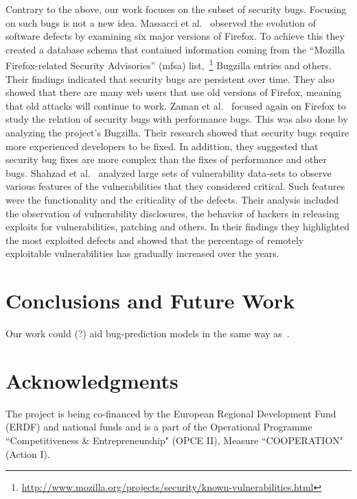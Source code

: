 \documentclass[conference]{IEEEtran}
\begin{document}
Contrary to the above, our work focuses on the subset of security bugs.
Focusing on such bugs is not a new idea. Massacci et al.~\cite{MNN11} observed
the evolution of software defects by examining six major versions of Firefox.
To achieve this they created a database schema that contained information
coming from the ``Mozilla Firefox-related Security Advisories'' ({\sc mfsa})
list,~\footnote{\url{http://www.mozilla.org/projects/security/known-vulnerabilities.html}}
Bugzilla entries and others. Their findings indicated that security bugs are
persistent over time. They also showed that there are many web users that use
old versions of Firefox, meaning that old attacks will continue to work.
Zaman et al.~\cite{ZAH11} focused again on Firefox to study the relation of
security bugs with performance bugs. This was also done by analyzing the project's
Bugzilla. Their research showed that security bugs require more experienced developers
to be fixed. In addittion, they suggested that security bug fixes are more complex than the
fixes of performance and other bugs.
Shahzad et al.~\cite{SSL12} analyzed large sets of vulnerability data-sets to observe
various features of the vulnerabilities that they considered critical. Such features
were the functionality and the criticality of the defects. Their analysis
included the observation of vulnerability disclosures, the behavior of
hackers in releasing exploits for vulnerabilities, patching and others. In
their findings they highlighted the most exploited defects and showed that
the percentage of remotely exploitable vulnerabilities has gradually increased
over the years.

\section{Conclusions and Future Work}
\label{sec:con}

Our work could (?) aid bug-prediction models in the same way as~\cite{BN11}.

\section*{Acknowledgments}

The project is being co-financed by the European Regional Development Fund (ERDF)
and national funds and is a part of the Operational Programme ``Competitiveness \&
Entrepreneurship" (OPCE II), Measure ``COOPERATION" (Action I).


 
\end{document}
